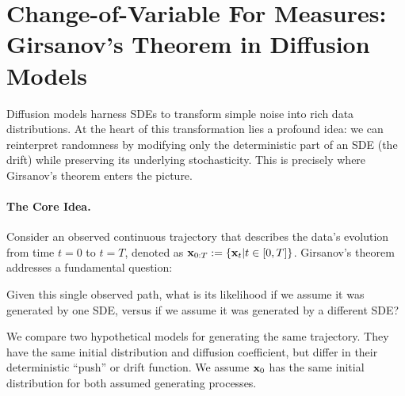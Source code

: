 


\newpage

\section{Change-of-Variable For Measures: Girsanov's Theorem in Diffusion Models}
Diffusion models harness SDEs to transform simple noise into rich data distributions. At the heart of this transformation lies a profound idea: we can reinterpret randomness by modifying only the deterministic part of an SDE (the drift) while preserving its underlying stochasticity. This is precisely where Girsanov’s theorem enters the picture.


\paragraph{The Core Idea.}
Consider an observed continuous trajectory that describes the data's evolution from time $t=0$ to $t=T$, denoted as ${\mathbf{x}}_{0:T}:=\{ {\mathbf{x}}_t|t \in [0,T] \}$. Girsanov's theorem addresses a fundamental question:
\begin{question}
    Given this single observed path, what is its likelihood if we assume it was generated by one SDE, versus if we assume it was generated by a different SDE?
\end{question}
We compare two hypothetical models for generating the same trajectory. They
have the same initial distribution and diffusion coefficient, but differ in
their deterministic ``push'' or drift function. We assume ${\mathbf{x}}_0$ has the same initial distribution for both assumed generating processes.

